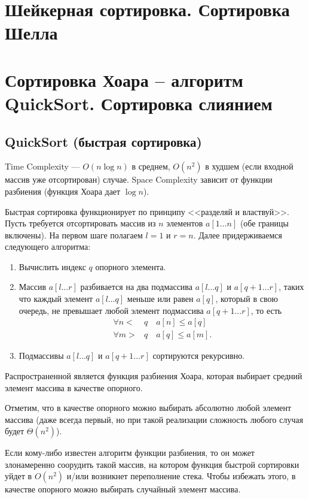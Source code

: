 \section{Шейкерная сортировка. Сортировка Шелла}

\section{Сортировка Хоара – алгоритм QuickSort. Сортировка слиянием}
\subsection{QuickSort (быстрая сортировка)}
Time Complexity --- $O(n\log n)$ в среднем, $O(n^2)$
в худшем (если входной массив уже отсортирован) случае. Space Complexity зависит 
от функции разбиения (функция Хоара дает $\log n$).

Быстрая сортировка функционирует по принципу <<разделяй и властвуй>>.
Пусть требуется отсортировать массив из $n$ элементов $a[1\dots n]$ (обе границы включены).
На первом шаге полагаем $l=1$ и $r=n$. Далее придерживаемся следующего алгоритма:
\begin{enumerate}
  \item Вычислить индекс $q$ опорного элемента.
  \item Массив $a[l\dots r]$
  разбивается на два подмассива $a[l\dots q]$ и $a[q+1\dots r]$, таких что каждый элемент $a[l\dots q]$
  меньше или равен $a[q]$, который в свою очередь, не превышает любой элемент подмассива $a[q+1\dots r]$, то есть
  \begin{align*}
    \forall n <& q \quad a[n] \leq a[q] \\
    \forall m >& q \quad a[q] \leq a[m].
  \end{align*}
  \item Подмассивы $a[l\dots q]$ и $a[q+1\dots r]$ сортируются рекурсивно.
\end{enumerate}

Распространенной является функция разбиения Хоара, которая выбирает средний элемент массива
в качестве опорного.

Отметим, что в качестве опорного можно выбирать абсолютно любой элемент массива
(даже всегда первый, но при такой реализации сложность любого случая будет $\Theta(n^2)$).

Если кому-либо известен алгоритм функции разбиения, то он может злонамеренно соорудить
такой массив, на котором функция быстрой сортировки уйдет в $O(n^2)$ и/или возникнет
переполнение стека. Чтобы избежать этого, в качестве опорного можно выбирать случайный
элемент массива.

